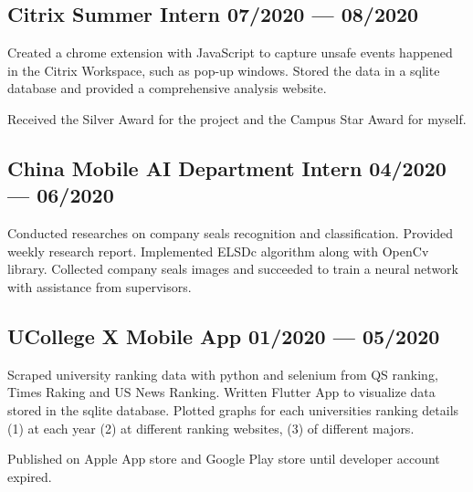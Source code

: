 \subsection{{
    Citrix Summer Intern
    \hfill 07/2020 --- 08/2020
}}
\begin{zitemize}
    \item   Created a chrome extension with JavaScript to capture unsafe events
            happened in the Citrix Workspace, such as pop-up windows. 
            Stored the data in a sqlite database and provided a comprehensive
            analysis website.
    \item   Received the Silver Award for the project and the Campus Star Award for myself.
\end{zitemize}


\subsection{{
    China Mobile AI Department Intern
    \hfill 04/2020 --- 06/2020
}}
\begin{zitemize}
    \item   Conducted researches on company seals recognition and classification.
            Provided weekly research report.
            Implemented ELSDc algorithm along with OpenCv library. 
            Collected company seals images and succeeded to train a neural network with assistance from supervisors.
\end{zitemize}


\subsection{{
    UCollege X Mobile App
    \hfill 01/2020 --- 05/2020
}}
\begin{zitemize}
    \item   Scraped university ranking data with python and selenium from QS ranking,
            Times Raking and US News Ranking.
            Written Flutter App to visualize data stored in the sqlite database.
            Plotted graphs for each universities ranking details (1) at each year
            (2) at different ranking websites, (3) of different majors.
    \item   Published on Apple App store and Google Play store until developer account expired.
\end{zitemize}
